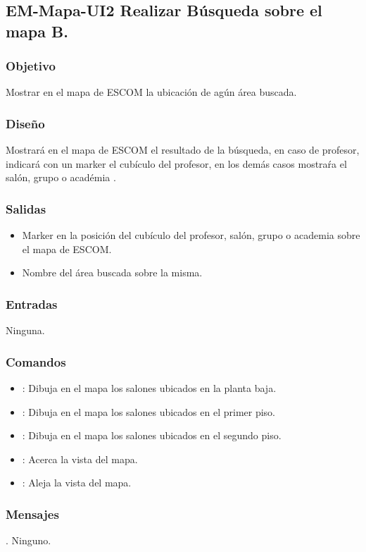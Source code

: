 
\pagebreak
\subsection{EM-Mapa-UI2 Realizar Búsqueda sobre el mapa B.}

\subsubsection{Objetivo}
	\noindent
	Mostrar en el mapa de ESCOM la ubicación de agún área buscada. 

\subsubsection{Diseño}
	\noindent
	Mostrará en el mapa de ESCOM el resultado de la búsqueda, en caso de profesor, indicará con un marker el cubículo del profesor, 
	en los demás casos mostraŕa el salón, grupo o académia .


\subsubsection{Salidas}
	\begin{itemize}
		\item Marker en la posición del cubículo del profesor, salón, grupo o academia sobre el mapa de ESCOM.
		\item Nombre del área buscada sobre la misma.
	\end{itemize}

\subsubsection{Entradas}
	\noindent
	Ninguna.

\subsubsection{Comandos}
\begin{itemize}
		\item {}: Dibuja en el mapa los salones ubicados en la planta baja.
		\item {}: Dibuja en el mapa los salones ubicados en el primer piso.
		\item {}: Dibuja en el mapa los salones ubicados en el segundo piso.
		\item \IUbutton{  +  }: Acerca la vista del mapa.
		\item \IUbutton{  -  }: Aleja la vista del mapa.
\end{itemize}

\subsubsection{Mensajes}
	\noindent.
	Ninguno.

